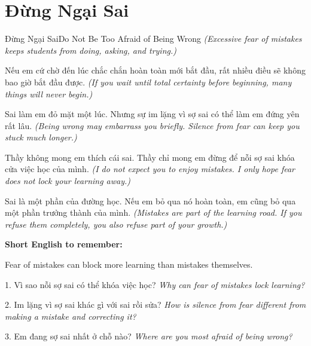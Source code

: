 \section{Đừng Ngại Sai}
\begin{truyen}{Đừng Ngại Sai}{Do Not Be Too Afraid of Being Wrong}
\textit{(Excessive fear of mistakes keeps students from doing, asking, and trying.)}

Nếu em cứ chờ đến lúc chắc chắn hoàn toàn mới bắt đầu, rất nhiều điều sẽ không bao giờ bắt đầu được.
\textit{(If you wait until total certainty before beginning, many things will never begin.)}

Sai làm em đỏ mặt một lúc. Nhưng sự im lặng vì sợ sai có thể làm em đứng yên rất lâu.
\textit{(Being wrong may embarrass you briefly. Silence from fear can keep you stuck much longer.)}

Thầy không mong em thích cái sai. Thầy chỉ mong em đừng để nỗi sợ sai khóa cửa việc học của mình.
\textit{(I do not expect you to enjoy mistakes. I only hope fear does not lock your learning away.)}
\end{truyen}

\begin{baihoc}
Sai là một phần của đường học. Nếu em bỏ qua nó hoàn toàn, em cũng bỏ qua một phần trưởng thành của mình.
\textit{(Mistakes are part of the learning road. If you refuse them completely, you also refuse part of your growth.)}
\end{baihoc}

\begin{ghinhoanh}
\textbf{Short English to remember:}

Fear of mistakes can block more learning than mistakes themselves.

\end{ghinhoanh}

\begin{tuhocnhanh}
1. Vì sao nỗi sợ sai có thể khóa việc học? \textit{Why can fear of mistakes lock learning?}

2. Im lặng vì sợ sai khác gì với sai rồi sửa? \textit{How is silence from fear different from making a mistake and correcting it?}

3. Em đang sợ sai nhất ở chỗ nào? \textit{Where are you most afraid of being wrong?}
\end{tuhocnhanh}
\ngancach
